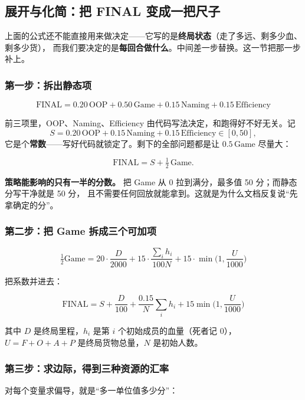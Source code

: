 \documentclass[UTF8,11pt,a4paper]{ctexart}
\begin{document}
\subsection{展开与化简：把 FINAL 变成一把尺子}

\noindent 上面的公式还不能直接用来做决定——它写的是\textbf{终局状态}（走了多远、剩多少血、剩多少货），
而我们要决定的是\textbf{每回合做什么}。中间差一步替换。这一节把那一步补上。

\subsubsection*{第一步：拆出静态项}

\[
\text{FINAL}=0.20\,\text{OOP}+0.50\,\text{Game}+0.15\,\text{Naming}+0.15\,\text{Efficiency}
\]

前三项里，OOP、Naming、Efficiency 由代码写法决定，和跑得好不好无关。记
\[
S=0.20\,\text{OOP}+0.15\,\text{Naming}+0.15\,\text{Efficiency}\in[0,50],
\]
它是个\textbf{常数}——写好代码就锁定了。剩下的全部问题都是让 $0.5\,\text{Game}$ 尽量大：

\[
\text{FINAL}=S+\tfrac12\,\text{Game}.
\]

\begin{keybox}[title={第一个结论}]
\textbf{策略能影响的只有一半的分数。}
把 Game 从 0 拉到满分，最多值 50 分；而静态分写干净就是 50 分，
且不需要任何回放就能拿到。这就是为什么文档反复说“先拿确定的分”。
\end{keybox}

\subsubsection*{第二步：把 Game 拆成三个可加项}

\[
\tfrac12\text{Game}=20\cdot\frac{D}{2000}+15\cdot\frac{\sum_i h_i}{100N}+15\cdot\min\!\Big(1,\frac{U}{1000}\Big)
\]

把系数并进去：

\[
\boxed{\ \text{FINAL}=S+\frac{D}{100}+\frac{0.15}{N}\sum_i h_i+15\min\!\Big(1,\frac{U}{1000}\Big)\ }
\]

其中 $D$ 是终局里程，$h_i$ 是第 $i$ 个初始成员的血量（死者记 0），$U=F+O+A+P$ 是终局货物总量，$N$ 是初始人数。

\subsubsection*{第三步：求边际，得到三种资源的汇率}

对每个变量求偏导，就是“多一单位值多少分”：
\end{document}
